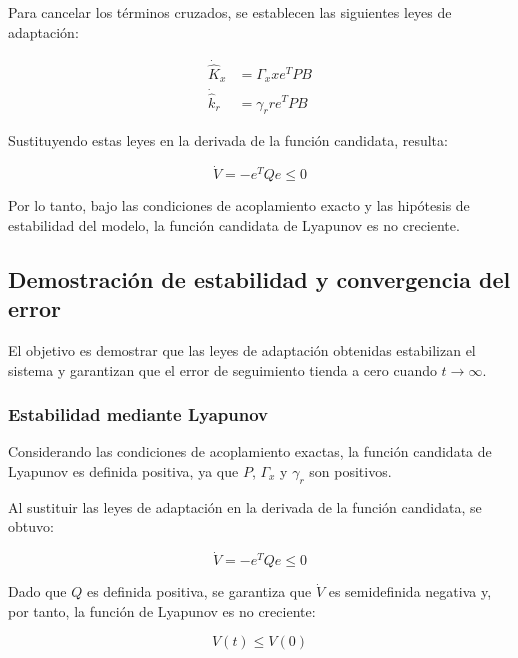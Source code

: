 \documentclass[conference,letterpaper]{IEEEtran}
\begin{document}
Para cancelar los términos cruzados, se establecen
las siguientes leyes de adaptación:

\begin{equation}\label{eq:adapt}
\boxed{
\begin{aligned}
\dot{\hat K}_x&=\Gamma_xxe^TPB\\
\dot{\hat k}_r&=\gamma_rre^TPB
\end{aligned}
}
\end{equation}

Sustituyendo estas leyes en la derivada de
la función candidata, resulta:

\begin{equation}\label{eq:Vdot}
\boxed{\dot V=-e^TQe\leq0}
\end{equation}

Por lo tanto, bajo las condiciones de acoplamiento
exacto y las hipótesis de estabilidad del modelo,
la función candidata de Lyapunov es no creciente.


\subsection{Demostración de estabilidad y convergencia del error}

El objetivo es demostrar que las leyes de adaptación
obtenidas estabilizan el sistema y garantizan que
el error de seguimiento tienda a cero cuando
$t\rightarrow\infty$.

\subsubsection{Estabilidad mediante Lyapunov}

Considerando las condiciones de acoplamiento exactas,
la función candidata de Lyapunov es definida positiva,
ya que $P$, $\Gamma_x$ y $\gamma_r$ son positivos.

Al sustituir las leyes de adaptación en la derivada
de la función candidata, se obtuvo:

\begin{equation}
    \boxed{\dot V=-e^TQe\leq0}
\end{equation}

Dado que $Q$ es definida positiva, se garantiza que
$\dot V$ es semidefinida negativa y, por tanto, la
función de Lyapunov es no creciente:

\begin{equation}
    V(t)\leq V(0)
\end{equation}
\end{document}
